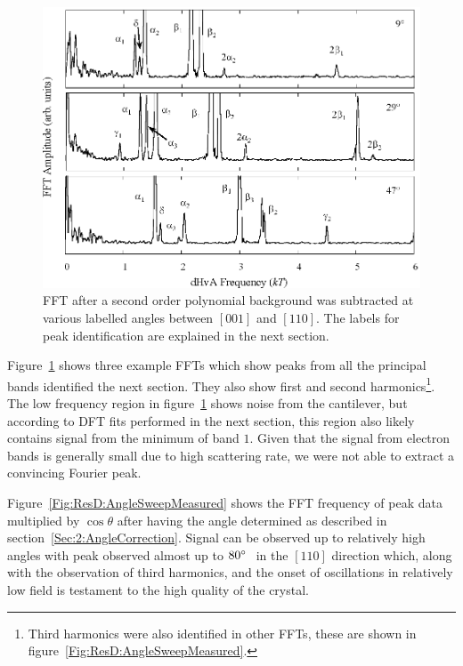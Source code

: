 \begin{figure}[htbp]
    \begin{center}
        \includegraphics[scale=0.7]{Chapter-dHvABaFe2P2/Figures/AngleDepMeasurements/FFTExamples/FFTExamples}
        \caption{\ac{FFT} after a second order polynomial background was subtracted at various labelled angles between $[001]$ and $[110]$. The labels for peak identification are explained in the next section.}
        \label{Fig:ResD:FFTExamples}
    \end{center}
\end{figure}

Figure~\ref{Fig:ResD:FFTExamples} shows three example \acp{FFT} which show peaks from all the principal bands identified the next section. They also show first and second harmonics\footnote{Third harmonics were also identified in other \acp{FFT}, these are shown in figure~\ref{Fig:ResD:AngleSweepMeasured}.}. The low frequency region in figure~\ref{Fig:ResD:FFTExamples} shows noise from the cantilever, but according to \ac{DFT} fits performed in the next section, this region also likely contains signal from the minimum of band $1$. Given that the signal from electron bands is generally small due to high scattering rate, we were not able to extract a convincing Fourier peak.

Figure~\ref{Fig:ResD:AngleSweepMeasured} shows the \ac{FFT} frequency of peak data multiplied by $\cos\theta$ after having the angle determined as described in section~\ref{Sec:2:AngleCorrection}.  Signal can be observed up to relatively high angles with peak observed almost up to $80\degree$ in the $[110]$ direction which, along with the observation of third harmonics, and the onset of oscillations in relatively low field is testament to the high quality of the crystal.

